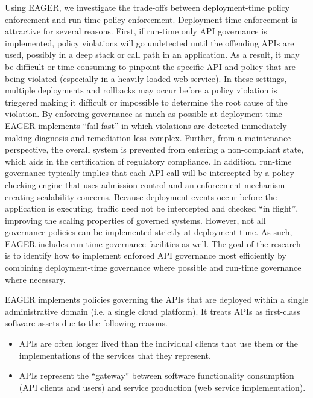 Using EAGER, we investigate the trade-offs between deployment-time policy
enforcement and run-time policy enforcement.
Deployment-time enforcement is attractive for several
reasons.  First, if run-time only API governance is implemented, 
policy violations will go undetected until the offending APIs are used,
possibly in a deep stack or call path in an application.  
As a result, it may be difficult or time consuming to pinpoint the specific
API and policy that are being violated (especially in a heavily loaded web service).
In these settings, multiple deployments and rollbacks may occur before a policy
violation is triggered making it difficult or impossible to determine the root
cause of the violation.  By enforcing governance as much as possible
at deployment-time
EAGER implements ``fail fast'' in which violations are detected
immediately making diagnosis and remediation less complex.  
Further, from a maintenance perspective,  the overall
system is prevented from entering a non-compliant state, which aids in the
certification of regulatory compliance.  In addition, run-time governance
typically implies that each API call will be intercepted by a policy-checking engine
that uses admission control and an enforcement mechanism creating scalability
concerns.  Because deployment
events occur before the application is executing,
traffic need not be intercepted and checked ``in flight'', improving the
scaling properties of governed systems.  However, not all governance policies can be
implemented strictly at deployment-time.  As such, EAGER includes run-time
governance facilities as well.  The goal of the research is to identify how to
implement enforced API governance most efficiently by combining deployment-time  
governance where possible and run-time governance where necessary.


EAGER implements policies governing the APIs that are 
deployed within a single administrative domain (i.e. a single cloud platform). 
It treats APIs as first-class software assets due to the following reasons.
\begin{itemize}
\item APIs are often
longer lived than the individual clients that use them or the implementations
of the services that they represent.
\item APIs represent the
``gateway'' between software functionality consumption 
(API clients and users) and service
production (web service implementation).
\end{itemize}

